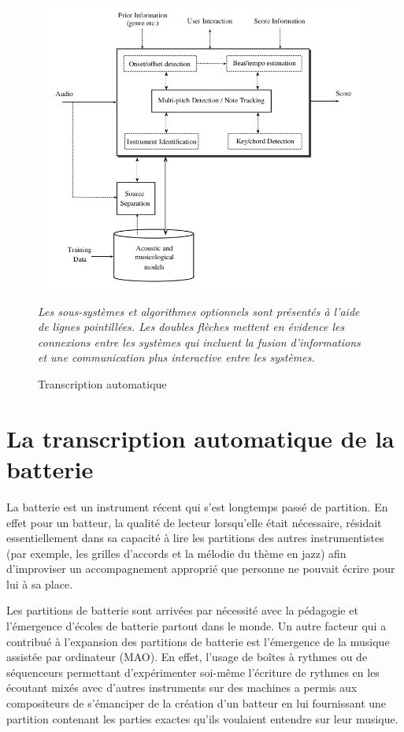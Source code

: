 \begin{figure}[!h]
	\centering
	\includegraphics[height=95mm, width=130mm]{z_images/1_contexte/1_general_process.png}
	\caption{Transcription automatique}
	\label{AMT_presentation}
	\textit{Les sous-systèmes et algorithmes optionnels sont présentés à l'aide
    de lignes pointillées. Les doubles flèches mettent en évidence les
connexions entre les systèmes qui incluent la fusion d'informations et une
communication plus interactive entre les systèmes.}
\end{figure}\newpage

\section{La transcription automatique de la batterie}
La batterie est un instrument récent qui s’est longtemps passé de partition. En
effet pour un batteur, la qualité de lecteur lorsqu’elle était nécessaire,
résidait essentiellement dans sa capacité à lire les partitions des autres
instrumentistes (par exemple, les grilles d’accords et la mélodie du thème en
jazz) afin d’improviser un accompagnement approprié que personne ne pouvait
écrire pour lui à sa place.

Les partitions de batterie sont arrivées par nécessité avec la pédagogie et
l’émergence d’écoles de batterie partout dans le monde. 
Un autre facteur qui a
contribué à l’expansion des partitions de batterie est l’émergence de la
musique assistée par ordinateur (MAO). En effet, l’usage de boîtes à rythmes ou
de séquenceurs permettant d’expérimenter soi-même l’écriture de rythmes en les
écoutant mixés avec d’autres instruments sur des machines a permis  aux
compositeurs de s’émanciper de la création d’un batteur en lui fournissant une
partition contenant les parties exactes qu’ils voulaient entendre sur leur
musique.


